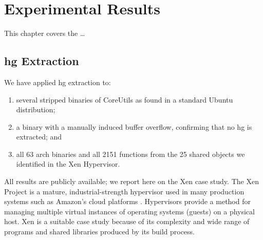 \chapter{Experimental Results}\label{ch:hg-results}
This chapter covers the \todo\dots

\section{\acl*{hg} Extraction}
We have applied \ac{hg} extraction to:
\begin{enumerate}
  \item several stripped binaries of CoreUtils as found in a standard Ubuntu distribution;
  \item a binary with a manually induced buffer overflow, confirming that no \ac{hg} is extracted; and
  \item all 63  \gls{arch} binaries and all 2151 functions from the 25 shared objects we identified in the Xen Hypervisor.
\end{enumerate}
All results are publicly available; we report here on the Xen case study.
The Xen Project is a mature, industrial-strength hypervisor used in many production systems such as Amazon's cloud platforms \autocite{chisnall2008definitive}.
Hypervisors provide a method for managing multiple virtual instances of operating systems (guests) on a physical host.
Xen is a suitable case study because of its complexity and wide range of programs and shared libraries produced by its build process.

